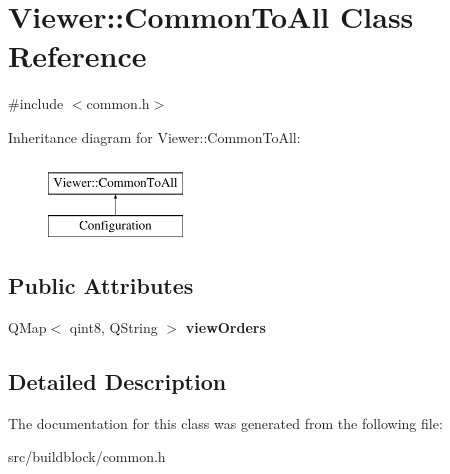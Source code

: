 \hypertarget{classViewer_1_1CommonToAll}{}\section{Viewer\+:\+:Common\+To\+All Class Reference}
\label{classViewer_1_1CommonToAll}


 




{\ttfamily \#include $<$common.\+h$>$}

Inheritance diagram for Viewer\+:\+:Common\+To\+All\+:\begin{figure}[H]
\begin{center}
\leavevmode
\includegraphics[height=2.000000cm]{classViewer_1_1CommonToAll}
\end{center}
\end{figure}
\subsection*{Public Attributes}
\begin{DoxyCompactItemize}
\item 
\mbox{\label{classViewer_1_1CommonToAll_a6d05cfc549856952676aedd015e3b57b}} 
Q\+Map$<$ qint8, Q\+String $>$ {\bfseries view\+Orders}
\end{DoxyCompactItemize}


\subsection{Detailed Description}


The documentation for this class was generated from the following file\+:\begin{DoxyCompactItemize}
\item 
src/buildblock/common.\+h\end{DoxyCompactItemize}

